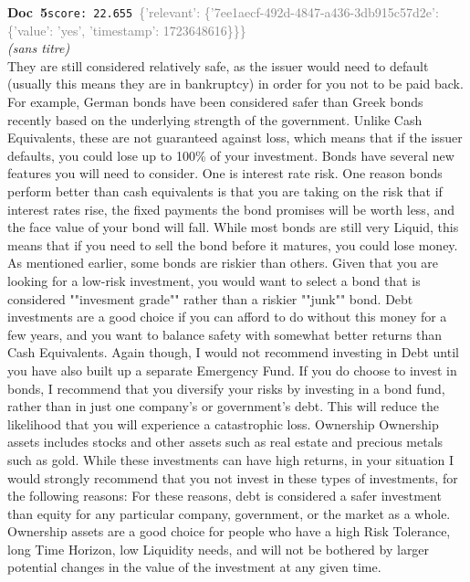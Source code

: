 \documentclass[a4paper,11pt]{article}
\begin{document}
\begin{docenv}
{\footnotesize\textcolor{doccolor}{\textbf{Doc~5}}}\hfill{\tiny\texttt{score:~22.655}}\ {\tiny\textcolor{gray}{\{'relevant': \{'7ee1aecf-492d-4847-a436-3db915c57d2e': \{'value': 'yes', 'timestamp': 1723648616\}\}\}}}\\[3pt]
{\small\textit{(sans titre)}}\\[2pt]
\vspace{2pt}
{\footnotesize 
They are still considered relatively safe, as the issuer would need to default (usually this means they are in bankruptcy) in order for you not to be paid back. For example, German bonds have been considered safer than Greek bonds recently based on the underlying strength of the government. Unlike Cash Equivalents, these are not guaranteed against loss, which means that if the issuer defaults, you could lose up to 100\% of your investment. Bonds have several new features you will need to consider. One is interest rate risk. One reason bonds perform better than cash equivalents is that you are taking on the risk that if interest rates rise, the fixed payments the bond promises will be worth less, and the face value of your bond will fall. While most bonds are still very Liquid, this means that if you need to sell the bond before it matures, you could lose money. As mentioned earlier, some bonds are riskier than others. Given that you are looking for a low-risk investment, you would want to select a bond that is considered ""invesment grade"" rather than a riskier ""junk"" bond. Debt investments are a good choice if you can afford to do without this money for a few years, and you want to balance safety with somewhat better returns than Cash Equivalents. Again though, I would not recommend investing in Debt until you have also built up a separate Emergency Fund. If you do choose to invest in bonds, I recommend that you diversify your risks by investing in a bond fund, rather than in just one company's or government's debt. This will reduce the likelihood that you will experience a catastrophic loss. Ownership Ownership assets includes stocks and other assets such as real estate and precious metals such as gold. While these investments can have high returns, in your situation I would strongly recommend that you not invest in these types of investments, for the following reasons: For these reasons, debt is considered a safer investment than equity for any particular company, government, or the market as a whole. Ownership assets are a good choice for people who have a high Risk Tolerance, long Time Horizon, low Liquidity needs, and will not be bothered by larger potential changes in the value of the investment at any given time.}
\end{docenv}
\end{document}
